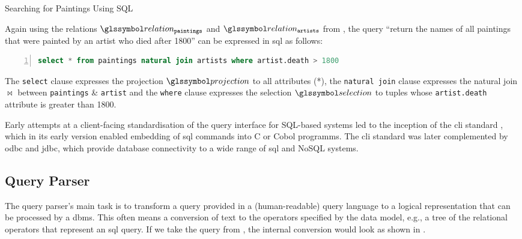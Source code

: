 \begin{example}[label=example:sql_query]{Searching for Paintings Using SQL}{}

    Again using the relations $\relation_{\mathtt{paintings}}$ and $\relation_{\mathtt{artists}}$ from , the query ``return the names of all paintings that were painted by an artist who died after 1800'' can be expressed in \acrshort{sql} as follows:

    \begin{lstlisting}[language=SQL, showspaces=false, basicstyle=\ttfamily, numbers=left, numberstyle=\tiny]
        select * from paintings natural join artists where artist.death > 1800
    \end{lstlisting}

    The \texttt{select} clause expresses the projection $\projection$ to all attributes (*), the \texttt{natural join} clause expresses the natural join $\Join$ between \texttt{paintings} \& \texttt{artist} and the \texttt{where} clause expresses the selection $\selection$ to tuples whose \texttt{artist.death} attribute is greater than 1800.
\end{example}

Early attempts at a client-facing standardisation of the query interface for SQL-based systems led to the inception of the \acrfull{cli} standard \cite{XOpen:1995CLI}, which in its early version enabled embedding of \acrshort{sql} commands into C or Cobol programms. The \acrshort{cli} standard was later complemented by \acrfull{odbc} and \acrfull{jdbc}, which provide database connectivity to a wide range of \acrshort{sql} and NoSQL systems.


\subsection{Query Parser}

The query parser's main task is to transform a query provided in a (human-readable) query language to a logical representation that can be processed by a \acrshort{dbms}. This often means a conversion of text to the operators specified by the data model, e.g., a tree of the relational operators that represent an \acrshort{sql} query. If we take the query from , the internal conversion would look as shown in .

